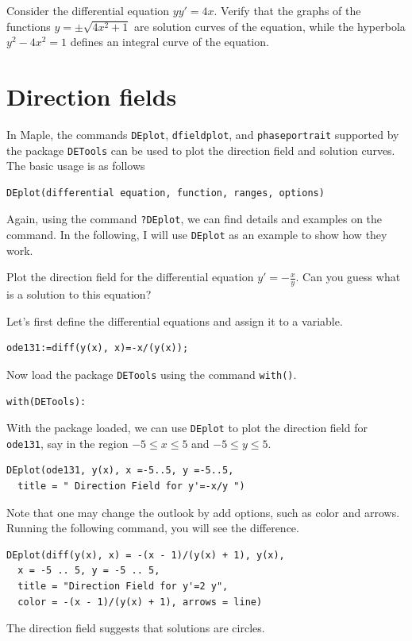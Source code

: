 \documentclass[
  12pt]{elegantbook}
\begin{document}
\begin{exercise}
Consider the differential equation \(yy'=4x\). Verify that the graphs of the functions \(y=\pm\sqrt{4x^2+1}\) are solution curves of the equation, while the hyperbola \(y^2-4x^2=1\) defines an integral curve of the equation.
\end{exercise}

\hypertarget{direction-fields}{%
\section{Direction fields}\label{direction-fields}}

In Maple, the commands \texttt{DEplot}, \texttt{dfieldplot}, and \texttt{phaseportrait} supported by the package \texttt{DETools} can be used to plot the direction field and solution curves. The basic usage is as follows

\begin{verbatim}
DEplot(differential equation, function, ranges, options)
\end{verbatim}

Again, using the command \texttt{?DEplot}, we can find details and examples on the command. In the following, I will use \texttt{DEplot} as an example to show how they work.

\begin{example}
Plot the direction field for the differential equation \(y'=-\frac xy\). Can you guess what is a solution to this equation?
\end{example}

\begin{solution}
Let's first define the differential equations and assign it to a variable.

\begin{verbatim}
ode131:=diff(y(x), x)=-x/(y(x));
\end{verbatim}

Now load the package \texttt{DETools} using the command \texttt{with()}.

\begin{verbatim}
with(DETools):
\end{verbatim}

With the package loaded, we can use \texttt{DEplot} to plot the direction field for \texttt{ode131}, say in the region \(-5\le x\le 5\) and \(-5\le y\le 5\).

\begin{verbatim}
DEplot(ode131, y(x), x =-5..5, y =-5..5, 
  title = " Direction Field for y'=-x/y ")
\end{verbatim}

Note that one may change the outlook by add options, such as color and arrows. Running the following command, you will see the difference.

\begin{verbatim}
DEplot(diff(y(x), x) = -(x - 1)/(y(x) + 1), y(x), 
  x = -5 .. 5, y = -5 .. 5,
  title = "Direction Field for y'=2 y",
  color = -(x - 1)/(y(x) + 1), arrows = line)
\end{verbatim}

The direction field suggests that solutions are circles.
\end{solution}
\end{document}
